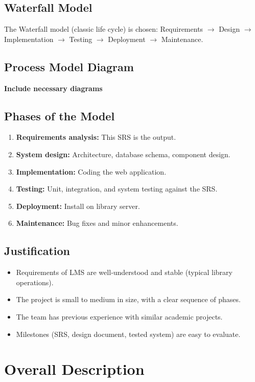 \documentclass[11pt,a4paper]{article}
\begin{document}
\subsection{Waterfall Model}
The Waterfall model (classic life cycle) is chosen: Requirements $\rightarrow$ Design $\rightarrow$ Implementation $\rightarrow$ Testing $\rightarrow$ Deployment $\rightarrow$ Maintenance.

\subsection{Process Model Diagram}
\textbf{Include necessary diagrams}

\subsection{Phases of the Model}
\begin{enumerate}[leftmargin=*]
  \item \textbf{Requirements analysis:} This SRS is the output.
  \item \textbf{System design:} Architecture, database schema, component design.
  \item \textbf{Implementation:} Coding the web application.
  \item \textbf{Testing:} Unit, integration, and system testing against the SRS.
  \item \textbf{Deployment:} Install on library server.
  \item \textbf{Maintenance:} Bug fixes and minor enhancements.
\end{enumerate}

\subsection{Justification}
\begin{itemize}[leftmargin=*]
  \item Requirements of LMS are well‑understood and stable (typical library operations).
  \item The project is small to medium in size, with a clear sequence of phases.
  \item The team has previous experience with similar academic projects.
  \item Milestones (SRS, design document, tested system) are easy to evaluate.
\end{itemize}


\section{Overall Description}
\end{document}
